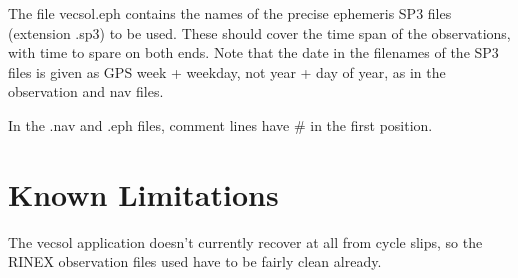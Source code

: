 The file vecsol.eph contains  the  names  of  the  precise ephemeris SP3 files (extension .sp3) to be used. These should cover the time span of the observations, with time to spare on both  ends. Note  that the date in the filenames of the SP3 files is given as GPS week + weekday, not year + day of year, as in the observation and nav files.

In the .nav and .eph files, comment lines have \# in the first position.

\section{Known Limitations}
The vecsol application doesn't currently recover at all from cycle slips, so the RINEX observation files used have to be fairly clean already.
